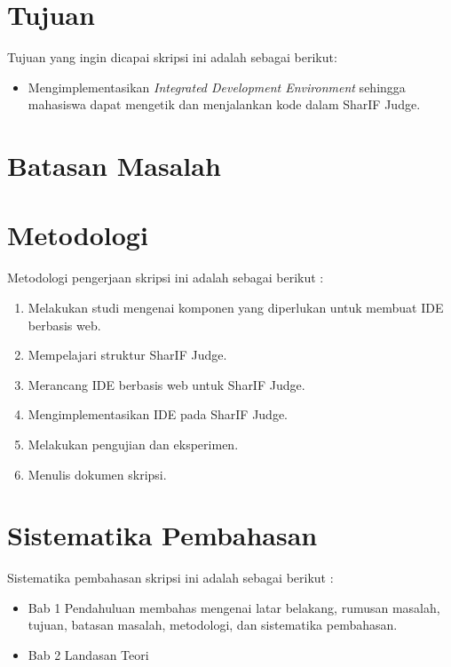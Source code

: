 \section{Tujuan}
\label{sec:tujuan}
Tujuan yang ingin dicapai skripsi ini adalah sebagai berikut:
\begin{itemize}
	\item Mengimplementasikan {\it Integrated Development Environment} sehingga mahasiswa dapat mengetik dan menjalankan kode dalam SharIF Judge.
\end{itemize}

\section{Batasan Masalah}
\label{sec:batasan}

\section{Metodologi}
\label{sec:metlit}
Metodologi pengerjaan skripsi ini adalah sebagai berikut :
\begin{enumerate}
	\item Melakukan studi mengenai komponen yang diperlukan untuk membuat IDE berbasis web.
	\item Mempelajari struktur SharIF Judge.
	\item Merancang IDE berbasis web untuk SharIF Judge.
	\item Mengimplementasikan IDE pada SharIF Judge.
	\item Melakukan pengujian dan eksperimen.
	\item Menulis dokumen skripsi.
\end{enumerate}

\section{Sistematika Pembahasan}
\label{sec:sispem}
Sistematika pembahasan skripsi ini adalah sebagai berikut :
\begin{itemize}
	\item Bab 1 Pendahuluan membahas mengenai latar belakang, rumusan masalah, tujuan, batasan masalah, metodologi, dan sistematika pembahasan.
	\item Bab 2 Landasan Teori
\end{itemize}
